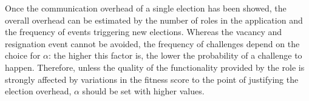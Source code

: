 Once the communication overhead of a single election has been showed, the overall overhead can be estimated by the number of roles in the application and the frequency of events triggering new elections. Whereas the vacancy and resignation event cannot be avoided, the frequency of  challenges depend on the choice for $\alpha$: the higher this factor is, the lower the probability of a challenge to happen. Therefore, unless the quality of the functionality provided by the role is strongly affected by variations in the fitness score to the point of justifying the election overhead, $\alpha$ should be set with higher values. 






%
%
%
%


